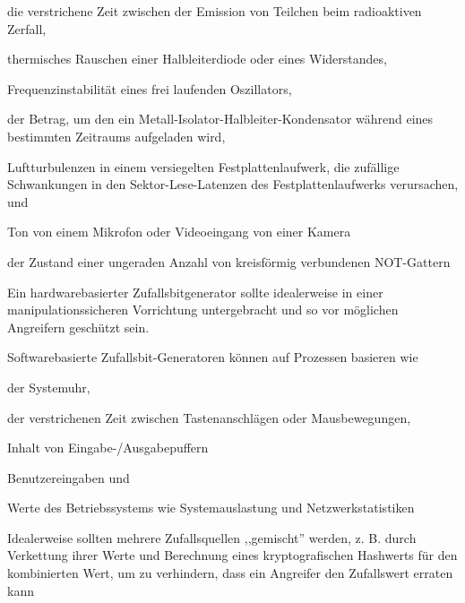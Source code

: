 \documentclass[a4paper]{article}
\begin{document}
\begin{multicols}{3}
\begin{itemize*}
            \begin{itemize*}
                  \item die verstrichene Zeit zwischen der Emission von Teilchen beim radioaktiven Zerfall,
                  \item thermisches Rauschen einer Halbleiterdiode oder eines Widerstandes,
                  \item Frequenzinstabilität eines frei laufenden Oszillators,
                  \item der Betrag, um den ein Metall-Isolator-Halbleiter-Kondensator während eines bestimmten Zeitraums aufgeladen wird,
                  \item Luftturbulenzen in einem versiegelten Festplattenlaufwerk, die zufällige Schwankungen in den Sektor-Lese-Latenzen des Festplattenlaufwerks verursachen, und
                  \item Ton von einem Mikrofon oder Videoeingang von einer Kamera
                  \item der Zustand einer ungeraden Anzahl von kreisförmig verbundenen NOT-Gattern
            \end{itemize*}
            \item
            Ein hardwarebasierter Zufallsbitgenerator sollte idealerweise in einer
            manipulationssicheren Vorrichtung untergebracht und so vor möglichen
            Angreifern geschützt sein.
            \item
            Softwarebasierte Zufallsbit-Generatoren können auf Prozessen basieren
            wie

            \begin{itemize*}
                  \item der Systemuhr,
                  \item der verstrichenen Zeit zwischen Tastenanschlägen oder Mausbewegungen,
                  \item Inhalt von Eingabe-/Ausgabepuffern
                  \item Benutzereingaben und
                  \item Werte des Betriebssystems wie Systemauslastung und Netzwerkstatistiken
            \end{itemize*}
            \item
            Idealerweise sollten mehrere Zufallsquellen ,,gemischt'' werden, z. B.
            durch Verkettung ihrer Werte und Berechnung eines kryptografischen
            Hashwerts für den kombinierten Wert, um zu verhindern, dass ein
            Angreifer den Zufallswert erraten kann


\end{itemize*}
\end{multicols}
\end{document}
